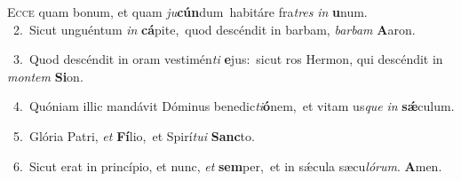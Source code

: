 \lettrine{\initial\textcolor{\initialcolor}{E}}{cce} quam bonum, et quam \textit{ju}\-\textbf{cún}dum~\star habitáre fra\textit{tres} \textit{in} \textbf{u}\-num.\\
{\numbfont\textcolor{\numbcolor}{~2.}}~Sicut unguéntum \textit{in} \textbf{cá}\-pite,~\star quod descéndit in barbam, \textit{bar}\-\textit{bam} \textbf{A}\-aron.\par
{\numbfont\textcolor{\numbcolor}{~3.}}~Quod descéndit in oram vestimén\textit{ti} \textbf{e}\-jus:~\star sicut ros Hermon, qui descéndit in \textit{mon}\-\textit{tem} \textbf{Si}\-on.\par
{\numbfont\textcolor{\numbcolor}{~4.}}~Quóniam illic mandávit Dóminus benedic\-\textit{ti}\-\textbf{ó}nem,~\star et vitam us\textit{que} \textit{in} \textbf{sǽ}\-culum.\par
{\numbfont\textcolor{\numbcolor}{~5.}}~Glória Patri, \textit{et} \textbf{Fí}\-lio,~\star et Spirí\-\textit{tu}\-\textit{i} \textbf{Sanc}\-to.\par
{\numbfont\textcolor{\numbcolor}{~6.}}~Sicut erat in princípio, et nunc, \textit{et} \textbf{sem}\-per,~\star et in sǽcula sæcu\-\textit{ló}\-\textit{rum}. \textbf{A}\-men.\par
